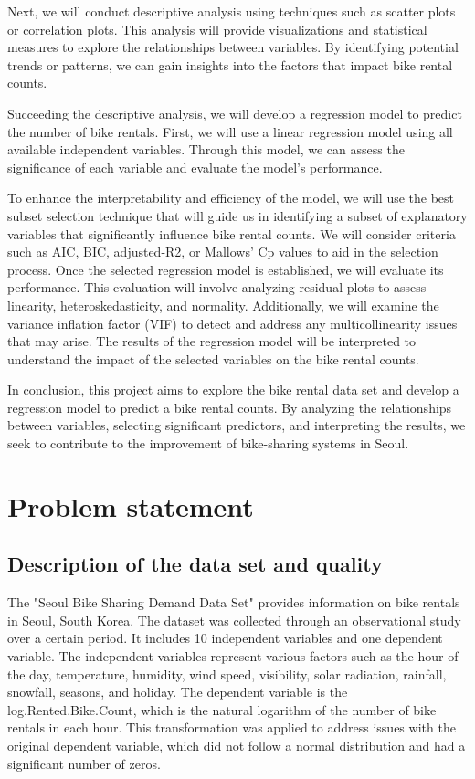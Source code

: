 \documentclass[12 pt]{scrartcl}
\begin{document}
Next, we will conduct descriptive analysis using techniques such as scatter plots or correlation plots. This analysis will provide visualizations and statistical measures to explore the relationships between variables. By identifying potential trends or patterns, we can gain insights into the factors that impact bike rental counts. 

Succeeding the descriptive analysis, we will develop a regression model to predict the number of bike rentals. First, we will use a linear regression model using all available independent variables. Through this model, we can assess the significance of each variable and evaluate the model's performance. 

To enhance the interpretability and efficiency of the model, we will use the best subset selection technique that will guide us in identifying a subset of explanatory variables that significantly influence bike rental counts. We will consider criteria such as AIC, BIC, adjusted-R2, or Mallows' Cp values to aid in the selection process. Once the selected regression model is established, we will evaluate its performance. This evaluation will involve analyzing residual plots to assess linearity, heteroskedasticity, and normality. Additionally, we will examine the variance inflation factor (VIF) to detect and address any multicollinearity issues that may arise. The results of the regression model will be interpreted to understand the impact of the selected variables on the bike rental counts.

In conclusion, this project aims to explore the bike rental data set and develop a regression model to predict a bike rental counts. By analyzing the relationships between variables, selecting significant predictors, and interpreting the results, we seek to contribute to the improvement of bike-sharing systems in Seoul.
 


\section{Problem statement}



\subsection{Description of the data set and quality}

The "Seoul Bike Sharing Demand Data Set" \citep{seoul} provides information on bike rentals in Seoul, South Korea. The dataset was collected through an observational study over a certain period. It includes 10 independent variables and one dependent variable. The independent variables represent various factors such as the hour of the day, temperature, humidity, wind speed, visibility, solar radiation, rainfall, snowfall, seasons, and holiday. The dependent variable is the log.Rented.Bike.Count, which is the natural logarithm of the number of bike rentals in each hour. This transformation was applied to address issues with the original dependent variable, which did not follow a normal distribution and had a significant number of zeros.
\end{document}

